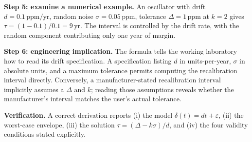 \begin{exercise}
\textbf{Step 5: examine a numerical example.} An oscillator with
drift $d = 0.1 \,\text{ppm}/\text{yr}$, random noise $\sigma =
0.05 \,\text{ppm}$, tolerance $\Delta = 1 \,\text{ppm}$ at $k = 2$
gives $\tau = (1 - 0.1)/0.1 = 9 \,\text{yr}$. The interval is
controlled by the drift rate, with the random component
contributing only one year of margin.

\textbf{Step 6: engineering implication.} The formula tells the
working laboratory how to read its drift specification. A
specification listing $d$ in units-per-year, $\sigma$ in absolute
units, and a maximum tolerance permits computing the recalibration
interval directly. Conversely, a manufacturer-stated recalibration
interval implicitly assumes a $\Delta$ and $k$; reading those
assumptions reveals whether the manufacturer's interval matches
the user's actual tolerance.

\textbf{Verification.} A correct derivation reports (i) the model
$\delta(t) = dt + \varepsilon$, (ii) the worst-case envelope, (iii)
the solution $\tau = (\Delta - k\sigma)/d$, and (iv) the four
validity conditions stated explicitly.
\end{exercise}

